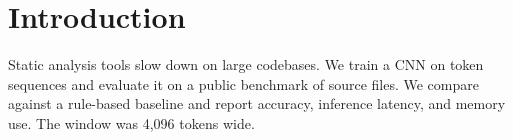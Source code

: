 \section{Introduction}
Static analysis tools slow down on large codebases. We train a CNN on token
sequences and evaluate it on a public benchmark of source files. We compare
against a rule-based baseline and report accuracy, inference latency, and memory
use. The window was 4{,}096 tokens wide.

